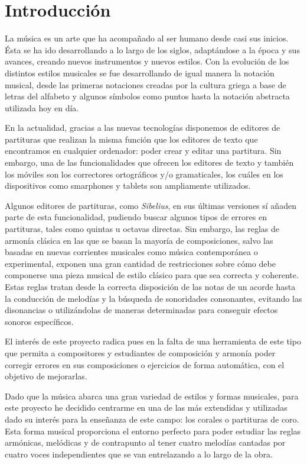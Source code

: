 \chapter*{Introducción}

La música es un arte que ha acompañado al ser humano desde casi sus inicios. Ésta se ha ido desarrollando a lo largo de los siglos, adaptándose a la época y sus avances, creando nuevos instrumentos y nuevos estilos. Con la evolución de los distintos estilos musicales se fue desarrollando de igual manera la notación musical, desde las primeras notaciones creadas por la cultura griega a base de letras del alfabeto y algunos símbolos como puntos hasta la notación abstracta utilizada hoy en día. 

En la actualidad, gracias a las nuevas tecnologías disponemos de editores de partituras que realizan la misma función que los editores de texto que encontramos en cualquier ordenador: poder crear y editar una partitura. Sin embargo, una de las funcionalidades que ofrecen los editores de texto y también los móviles son los correctores ortográficos y/o gramaticales, los cuáles en los dispositivos como smarphones y tablets son ampliamente utilizados. 

Algunos editores de partituras, como \textit{Sibelius}, en sus últimas versiones sí añaden parte de esta funcionalidad, pudiendo buscar algunos tipos de errores en partituras, tales como quintas u octavas directas. Sin embargo, las reglas de armonía clásica en las que se basan la mayoría de composiciones, salvo las basadas en nuevas corrientes musicales como música contemporánea o experimental, exponen una gran cantidad de restricciones sobre cómo debe componerse una pieza musical de estilo clásico para que sea correcta y coherente.  Estas reglas tratan desde la correcta disposición de las notas de un acorde hasta la conducción de melodías y la búsqueda de sonoridades consonantes, evitando las disonancias o utilizándolas de maneras determinadas para conseguir efectos sonoros específicos. 

El interés de este proyecto radica pues en la falta de una herramienta de este tipo que permita a compositores y estudiantes de composición y armonía poder corregir errores en sus composiciones o ejercicios de forma automática, con el objetivo de mejorarlas.

Dado que la música abarca una gran variedad de estilos y formas musicales, para este proyecto he decidido centrarme en una de las más extendidas y utilizadas dado su interés para la enseñanza de este campo: los corales o partituras de coro. Esta forma musical proporciona el entorno perfecto para poder estudiar las reglas armónicas, melódicas y de contrapunto al tener cuatro melodías cantadas por cuatro voces independientes que se van entrelazando a lo largo de la obra. 

